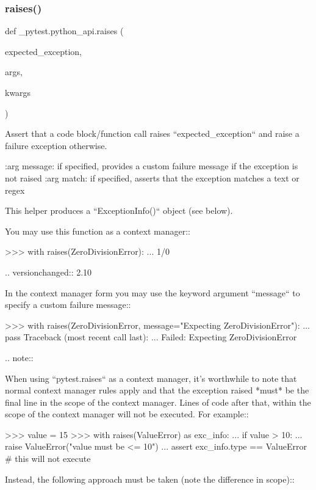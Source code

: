 \subsubsection{\texorpdfstring{raises()}{raises()}}
{\footnotesize\ttfamily def \+\_\+pytest.\+python\+\_\+api.\+raises (\begin{DoxyParamCaption}\item[{}]{expected\+\_\+exception,  }\item[{}]{args,  }\item[{}]{kwargs }\end{DoxyParamCaption})}

\begin{DoxyVerb}Assert that a code block/function call raises ``expected_exception``
and raise a failure exception otherwise.

:arg message: if specified, provides a custom failure message if the
    exception is not raised
:arg match: if specified, asserts that the exception matches a text or regex

This helper produces a ``ExceptionInfo()`` object (see below).

You may use this function as a context manager::

    >>> with raises(ZeroDivisionError):
    ...    1/0

.. versionchanged:: 2.10

In the context manager form you may use the keyword argument
``message`` to specify a custom failure message::

    >>> with raises(ZeroDivisionError, message="Expecting ZeroDivisionError"):
    ...    pass
    Traceback (most recent call last):
      ...
    Failed: Expecting ZeroDivisionError

.. note::

   When using ``pytest.raises`` as a context manager, it's worthwhile to
   note that normal context manager rules apply and that the exception
   raised *must* be the final line in the scope of the context manager.
   Lines of code after that, within the scope of the context manager will
   not be executed. For example::

       >>> value = 15
       >>> with raises(ValueError) as exc_info:
       ...     if value > 10:
       ...         raise ValueError("value must be <= 10")
       ...     assert exc_info.type == ValueError  # this will not execute

   Instead, the following approach must be taken (note the difference in
   scope)::


\end{DoxyVerb}
